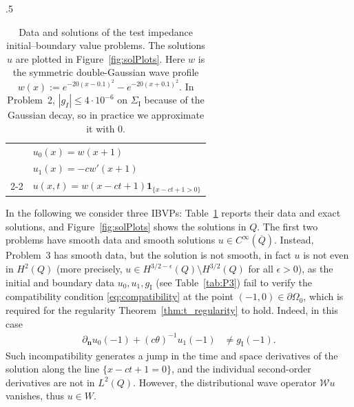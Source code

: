\documentclass[a4paper]{article}
\theoremstyle{plain}
\theoremstyle{definition}
\newcommand{\operator}[1]{\mathcal{#1}}
\newcommand{\NormDer}{{\partial_{\bm{n}}}}
\newcommand{\SI}{{\Sigma_{\mathrm I}}}
\newcommand{\gI}{{g_{\mathrm I}}}
\newcommand{\oW}{{\operator{W}}}
\newcommand{\OZ}{{\Omega_0}}
\begin{document}
\begin{table}[htb]
\begin{subtable}[t]{.5\linewidth}
\begin{tabular}{|c|p{.85\linewidth}|}
		    & $u_0(x) = w(x + 1)$\\
		    & $u_1(x) = - c w'(x + 1)$\\\cline{2-2}
		    & $u(x, t) = w(x - ct + 1) \mathbf{1}_{\{x - ct + 1 > 0\}}$\\\hline
	\end{tabular}
	\caption{IBVP for a non-smooth travelling wave.}
	\label{tab:P3}
	\end{subtable}
	\caption{Data and solutions of the test impedance initial--boundary value problems.
	The solutions $u$ are plotted in Figure~\ref{fig:solPlots}.
	Here $w$ is the symmetric double-Gaussian wave profile $w(x):=e^{-20(x-0.1)^2}-e^{-20(x+0.1)^2}$.
	In Problem~2, $|g_I|\le 4\cdot10^{-6}$ on $\SI$ because of the Gaussian decay, so in practice we approximate it with 0.}
	\label{tab:Problems}
\end{table}
\renewcommand{\arraystretch}{\prestretch}




In the following we consider three IBVPs:
Table~\ref{tab:Problems} reports their data and exact solutions, and Figure~\ref{fig:solPlots} shows the solutions in $Q$.
The first two problems have smooth data and smooth solutions $u\in C^\infty(\overline Q)$.
Instead, Problem~3 has smooth data, but the solution is not smooth, in fact $u$ is not even in $H^2(Q)$ (more precisely, $u\in H^{3/2-\epsilon}(Q)\setminus H^{3/2}(Q)$ for all $\epsilon>0$), as the initial and boundary data $u_0,u_1,\gI$ (see Table~\ref{tab:P3}) fail to verify the compatibility condition \eqref{eq:compatibility} at the point $(-1,0)\in \partial\OZ$, which is required for the regularity Theorem~\ref{thm:t_regularity} to hold.
Indeed, in this case
\begin{align*}
	\NormDer u_0(-1)+(c\theta)^{-1}u_1(-1)&\neq\gI(-1).
\end{align*}
Such incompatibility generates a jump in the time and space derivatives of the solution along the line $\{x-ct+1=0\}$, and the individual second-order derivatives are not in $L^2(Q)$.
However, the distributional wave operator $\oW u$ vanishes, thus $u\in W$.
\end{document}
